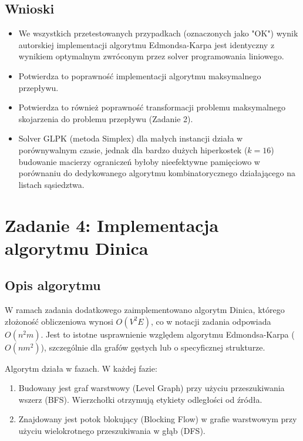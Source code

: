 \documentclass[11pt, a4paper]{article}
\begin{document}
\subsection{Wnioski}
\begin{itemize}
    \item We wszystkich przetestowanych przypadkach (oznaczonych jako "OK") wynik autorskiej implementacji algorytmu Edmondsa-Karpa jest identyczny z wynikiem optymalnym zwróconym przez solver programowania liniowego.
    \item Potwierdza to poprawność implementacji algorytmu maksymalnego przepływu.
    \item Potwierdza to również poprawność transformacji problemu maksymalnego skojarzenia do problemu przepływu (Zadanie 2).
    \item Solver GLPK (metoda Simplex) dla małych instancji działa w porównywalnym czasie, jednak dla bardzo dużych hiperkostek ($k=16$) budowanie macierzy ograniczeń byłoby nieefektywne pamięciowo w porównaniu do dedykowanego algorytmu kombinatorycznego działającego na listach sąsiedztwa.
\end{itemize}


\section{Zadanie 4: Implementacja algorytmu Dinica}

\subsection{Opis algorytmu}
W ramach zadania dodatkowego zaimplementowano algorytm Dinica, którego złożoność obliczeniowa wynosi $O(V^2 E)$, co w notacji zadania odpowiada $O(n^2 m)$. Jest to istotne usprawnienie względem algorytmu Edmondsa-Karpa ($O(nm^2)$), szczególnie dla grafów gęstych lub o specyficznej strukturze.

Algorytm działa w fazach. W każdej fazie:
\begin{enumerate}
    \item Budowany jest graf warstwowy (Level Graph) przy użyciu przeszukiwania wszerz (BFS). Wierzchołki otrzymują etykiety odległości od źródła.
    \item Znajdowany jest potok blokujący (Blocking Flow) w grafie warstwowym przy użyciu wielokrotnego przeszukiwania w głąb (DFS).
\end{enumerate}
\end{document}
